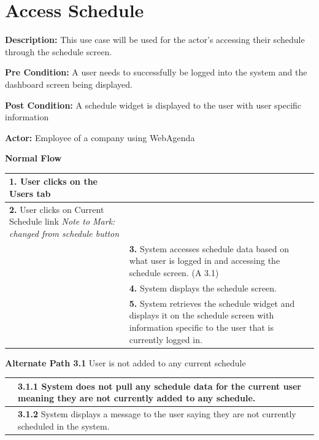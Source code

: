 \documentclass[letterpaper,12pt]{report}
\begin{document}
\section{Access Schedule}

\begin{description}
 \item \textbf{Description:} \newline This use case will be used for the actor’s accessing their schedule through the schedule screen.
 \item \textbf{Pre Condition:} \newline A user needs to successfully be logged into the system and the dashboard screen being displayed.
 \item \textbf{Post Condition:} \newline A schedule widget is displayed to the user with user specific information
 \item \textbf{Actor:} \newline Employee of a company using WebAgenda
\end{description}

{ \centering \textbf{Normal Flow}
\begin{center}
\xuchead
\begin{tabular}{| p{8.5cm} | p{8.5cm} |}
\hline
\textbf{1.} User clicks on the Users tab & \\
\hline
\textbf{2.} User clicks on Current Schedule link \textit{Note to Mark: changed from schedule button} & \\
\hline
& \textbf{3.} System\index{system} accesses schedule data based on what user is logged in and accessing the schedule screen. (A 3.1) \\ 
\hline
& \textbf{4.} System displays the schedule screen. \\
\hline
& \textbf{5.} System retrieves the schedule widget and displays it on the schedule screen with information specific to the user that is currently logged in. \\
\hline
\end{tabular}
\end{center}
\centering \textbf{Alternate Path 3.1 }
\linebreak User is not added to any current schedule
\begin{center}
\xuchead
\begin{tabular}{| p{8.5cm} | p{8.5cm} |}
\hline
& \textbf{3.1.1} System\index{system} does not pull any schedule data for the current user meaning they are not currently added to any schedule. \\
\hline
& \textbf{3.1.2} System displays a message to the user saying they are not currently scheduled in the system. \\
\hline
\end{tabular}
\end{center}
\pagebreak
}
\end{document}
